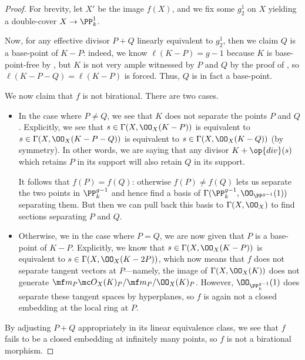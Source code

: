 \documentclass[../notes.tex]{subfiles}
\begin{document}
\begin{proof}
	For brevity, let $X'$ be the image $f(X)$, and we fix some $g^1_2$ on $X$ yielding a double-cover $X\to\PP^1_k$.
	
	Now, for any effective divisor $P+Q$ linearly equivalent to $g^1_2$, then we claim $Q$ is a base-point of $K-P$: indeed, we know $\ell(K-P)=g-1$ because $K$ is base-point-free by , but $K$ is not very ample witnessed by $P$ and $Q$ by the proof of , so $\ell(K-P-Q)=\ell(K-P)$ is forced. Thus, $Q$ is in fact a base-point.

	We now claim that $f$ is not birational. There are two cases.
	\begin{itemize}
		\item In the case where $P\ne Q$, we see that $K$ does not separate the points $P$ and $Q$. Explicitly, we see that $s\in\Gamma(X,\OO_X(K-P))$ is equivalent to $s\in\Gamma(X,\OO_X(K-P-Q))$ is equivalent to $s\in\Gamma(X,\OO_X(K-Q))$ (by symmetry). In other words, we are saying that any divisor $K+\op{div}(s)$ which retains $P$ in its support will also retain $Q$ in its support.
		
		It follows that $f(P)=f(Q)$: otherwise $f(P)\ne f(Q)$ lets us separate the two points in $\PP^{g-1}_k$ and hence find a basis of $\Gamma(\PP^{g-1}_k,\OO_{\PP^{g-1}}(1))$ separating them. But then we can pull back this basis to $\Gamma(X,\OO_X)$ to find sections separating $P$ and $Q$.

		\item Otherwise, we in the case where $P=Q$, we are now given that $P$ is a base-point of $K-P$. Explicitly, we know that $s\in\Gamma(X,\OO_X(K-P))$ is equivalent to $s\in\Gamma(X,\OO_X(K-2P))$, which now means that $f$ does not separate tangent vectors at $P$---namely, the image of $\Gamma(X,\OO_X(K))$ does not generate $\mf m_P\mc O_X(K)_P/\mf m_P/\OO_X(K)_P$. However, $\OO_{\PP^{g-1}_k}(1)$ does separate these tangent spaces by hyperplanes, so $f$ is again not a closed embedding at the local ring at $P$.
	\end{itemize}
	By adjusting $P+Q$ appropriately in its linear equivalence class, we see that $f$ fails to be a closed embedding at infinitely many points, so $f$ is not a birational morphism.


\end{proof}
\end{document}
